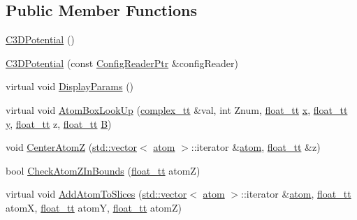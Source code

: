 \subsection*{Public Member Functions}
\begin{DoxyCompactItemize}
\item 
\hyperlink{class_q_s_t_e_m_1_1_c3_d_potential_ad0cee3664e0c6ffb040b05a84d69d31e}{C3\-D\-Potential} ()
\item 
\hyperlink{class_q_s_t_e_m_1_1_c3_d_potential_a8d2193c2deffaa379c38311033be34f2}{C3\-D\-Potential} (const \hyperlink{namespace_q_s_t_e_m_af9424707fe9f6503298f49b41304bd35}{Config\-Reader\-Ptr} \&config\-Reader)
\item 
virtual void \hyperlink{class_q_s_t_e_m_1_1_c3_d_potential_ab3507f4fcc46ad7798f1e09f2a964a59}{Display\-Params} ()
\item 
virtual void \hyperlink{class_q_s_t_e_m_1_1_c3_d_potential_aa4d56b3b4f91f30efb263b11a5886e69}{Atom\-Box\-Look\-Up} (\hyperlink{namespace_q_s_t_e_m_afa320ea3cd2f5ff080c422f81b803a32}{complex\-\_\-tt} \&val, int Znum, \hyperlink{namespace_q_s_t_e_m_a915d7caa497280d9f927c4ce8d330e47}{float\-\_\-tt} \hyperlink{_read_d_m3___matlab_8m_a9336ebf25087d91c818ee6e9ec29f8c1}{x}, \hyperlink{namespace_q_s_t_e_m_a915d7caa497280d9f927c4ce8d330e47}{float\-\_\-tt} \hyperlink{qmb_8m_a2fb1c5cf58867b5bbc9a1b145a86f3a0}{y}, \hyperlink{namespace_q_s_t_e_m_a915d7caa497280d9f927c4ce8d330e47}{float\-\_\-tt} z, \hyperlink{namespace_q_s_t_e_m_a915d7caa497280d9f927c4ce8d330e47}{float\-\_\-tt} \hyperlink{xyz2cfg_8m_a422e4e22a48b9ea42c9dfe12b157229d}{B})
\item 
void \hyperlink{class_q_s_t_e_m_1_1_c3_d_potential_a82c41479d598f1b31107fd71d6ff9d95}{Center\-Atom\-Z} (\hyperlink{qmb_8m_af54b69a32590de218622e869b06b47b3}{std\-::vector}$<$ \hyperlink{namespace_q_s_t_e_m_a402dabc31a7a1fe906d0cdd138c69686}{atom} $>$\-::iterator \&\hyperlink{namespace_q_s_t_e_m_a402dabc31a7a1fe906d0cdd138c69686}{atom}, \hyperlink{namespace_q_s_t_e_m_a915d7caa497280d9f927c4ce8d330e47}{float\-\_\-tt} \&z)
\item 
bool \hyperlink{class_q_s_t_e_m_1_1_c3_d_potential_afb109dabf235d48cc7c87e7cafe174fd}{Check\-Atom\-Z\-In\-Bounds} (\hyperlink{namespace_q_s_t_e_m_a915d7caa497280d9f927c4ce8d330e47}{float\-\_\-tt} atom\-Z)
\item 
virtual void \hyperlink{class_q_s_t_e_m_1_1_c3_d_potential_a5887aad522561bfccf9b6f8213ec876b}{Add\-Atom\-To\-Slices} (\hyperlink{qmb_8m_af54b69a32590de218622e869b06b47b3}{std\-::vector}$<$ \hyperlink{namespace_q_s_t_e_m_a402dabc31a7a1fe906d0cdd138c69686}{atom} $>$\-::iterator \&\hyperlink{namespace_q_s_t_e_m_a402dabc31a7a1fe906d0cdd138c69686}{atom}, \hyperlink{namespace_q_s_t_e_m_a915d7caa497280d9f927c4ce8d330e47}{float\-\_\-tt} atom\-X, \hyperlink{namespace_q_s_t_e_m_a915d7caa497280d9f927c4ce8d330e47}{float\-\_\-tt} atom\-Y, \hyperlink{namespace_q_s_t_e_m_a915d7caa497280d9f927c4ce8d330e47}{float\-\_\-tt} atom\-Z)

\end{DoxyCompactItemize}
